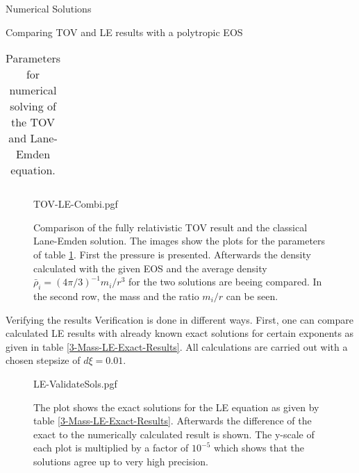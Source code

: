 \begin{section}{Numerical Solutions}
\begin{subsection}{Comparing TOV and LE results with a polytropic EOS}
\begin{table}[H]
\begin{tabular}{@{}llcll@{}}
		\bottomrule
	\end{tabular}
	\caption[Numerical Parameters for TOV and Lane-Emden equation]{Parameters for numerical solving of the TOV and Lane-Emden equation.}
	\label{4-NumSol-TOVParameters}
\end{table}%
\begin{figure}[H]
	\centering
	{TOV-LE-Combi.pgf}
	\caption[Comparison TOV and LE equation]{Comparison of the fully relativistic TOV result and the classical Lane-Emden solution. The images show the plots for the parameters of table \ref{4-NumSol-TOVParameters}. First the pressure is presented. Afterwards the density calculated with the given EOS and the average density $\bar{\rho}_i=(4\pi/3)^{-1}m_i/r^3$ for the two solutions are beeing compared. In the second row, the mass and the ratio $m_i/r$ can be seen.}
	\label{4-NumSol-TOVEqEasyEOS}
\end{figure}
\end{subsection}
%
%
\begin{subsection}{Verifying the results}
Verification is done in different ways. First, one can compare calculated LE results with already known exact  solutions for certain exponents as given in table \ref{3-Mass-LE-Exact-Results}. All calculations are carried out with a chosen stepsize of $d\xi=0.01$.
\begin{figure}[H]
	\centering
	{LE-ValidateSols.pgf}
	\caption[Validation of numerical LE results]{The plot shows the exact solutions for the LE equation as given by table \ref{3-Mass-LE-Exact-Results}. Afterwards the difference of the exact to the numerically calculated result is shown. The y-scale of each plot is multiplied by a factor of $10^{-5}$ which shows that the solutions agree up to very high precision.}
	\label{4-NumSol-ValidateLEResults}
\end{figure}


\end{subsection}
\end{section}

